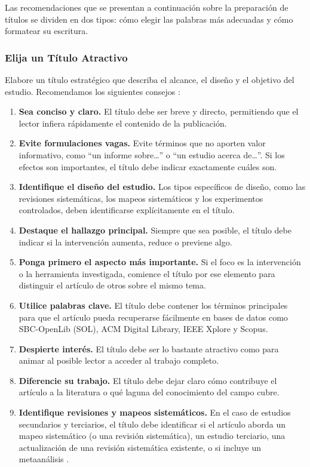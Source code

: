 \documentclass[spanish]{rbie2026}%
\begin{document}
Las recomendaciones que se presentan a continuación sobre la preparación de títulos se dividen en dos tipos: cómo elegir las palabras más adecuadas y cómo formatear su escritura.

\subsubsection{Elija un Título Atractivo}

Elabore un título estratégico que describa el alcance, el diseño y el objetivo del estudio. Recomendamos los siguientes consejos \citep{herbst2024structuring,ecarnort_writing_article_2015}:

\begin{enumerate}
  \item \textbf{Sea conciso y claro.} El título debe ser breve y directo, permitiendo que el lector infiera rápidamente el contenido de la publicación.

  \item \textbf{Evite formulaciones vagas.} Evite términos que no aporten valor informativo, como ``un informe sobre\ldots'' o ``un estudio acerca de\ldots''. Si los efectos son importantes, el título debe indicar exactamente cuáles son.

  \item \textbf{Identifique el diseño del estudio.} Los tipos específicos de diseño, como las revisiones sistemáticas, los mapeos sistemáticos y los experimentos controlados, deben identificarse explícitamente en el título.

  \item \textbf{Destaque el hallazgo principal.} Siempre que sea posible, el título debe indicar si la intervención aumenta, reduce o previene algo.

  \item \textbf{Ponga primero el aspecto más importante.} Si el foco es la intervención o la herramienta investigada, comience el título por ese elemento para distinguir el artículo de otros sobre el mismo tema.

  \item \textbf{Utilice palabras clave.} El título debe contener los términos principales para que el artículo pueda recuperarse fácilmente en bases de datos como SBC-OpenLib (SOL), ACM Digital Library, IEEE Xplore y Scopus.

  \item \textbf{Despierte interés.} El título debe ser lo bastante atractivo como para animar al posible lector a acceder al trabajo completo.

  \item \textbf{Diferencie su trabajo.} El título debe dejar claro cómo contribuye el artículo a la literatura o qué laguna del conocimiento del campo cubre.

  \item \textbf{Identifique revisiones y mapeos sistemáticos.} En el caso de estudios secundarios y terciarios, el título debe identificar si el artículo aborda un mapeo sistemático (o una revisión sistemática), un estudio terciario, una actualización de una revisión sistemática existente, o si incluye un metaanálisis \cite{Kitchenham2023_SEGRESS_supp}.
\end{enumerate}
\end{document}
